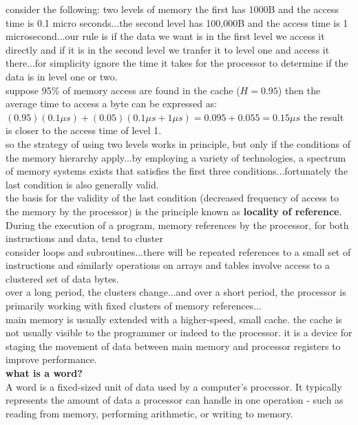 \documentclass{article}
\begin{document}
consider the following: two levels of memory the first has 1000B and the access time is 0.1 micro seconds...the second level has 100,000B and the access time is 1 microsecond...our rule is if the data we want is in the first level we access it directly and if it is in the second level we tranfer it to level one and access it there...for simplicity ignore the time it takes for the processor to determine if the data is in level one or two.\\

suppose 95\% of memory access are found in the cache ($H = 0.95$) then the average time to access a byte can be expressed as: $(0.95)(0.1\mu s) + (0.05)(0.1\mu s + 1\mu s) = 0.095 + 0.055 = 0.15 \mu s$ the result is closer to the access time of level 1.\\

so the strategy of using two levels works in principle, but only if the conditions of the memory hierarchy apply...by employing a variety of technologies, a spectrum of memory systems exists that satisfies the first three conditions...fortunately the last condition is also generally valid.\\

the basis for the validity of the last condition (decreased frequency of access to the memory by the processor) is the principle known as \textbf{locality of reference}.\\

During the execution of a program, memory references by the processor, for both instructions and data, tend to cluster\\

consider loops and subroutines...there will be repeated references to a small set of instructions and similarly operations on arrays and tables involve access to a clustered set of data bytes.\\

over a long period, the clusters change...and over a short period, the processor is primarily working with fixed clusters of memory references...\\

main memory is usually extended with a higher-speed, small cache. the cache is not usually visible to the programmer or indeed to the processor. it is a device for staging the movement of data between main memory and processor registers to improve performance.\\

\textbf{what is a word?}\\
A word is a fixed-sized unit of data used by a computer's processor. It typically represents the amount of data a processor can handle in one operation - such as reading from memory, performing arithmetic, or writing to memory.
\end{document}
